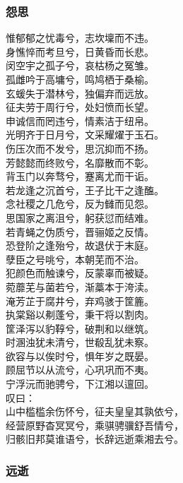 \documentclass[]{article}
\begin{document}
\hypertarget{header-n331}{%
\subsubsection{怨思}\label{header-n331}}

惟郁郁之忧毒兮，志坎壈而不违。\\
身憔悴而考旦兮，日黄昏而长悲。\\
闵空宇之孤子兮，哀枯杨之冤雏。\\
孤雌吟于高墉兮，鸣鸠栖于桑榆。\\
玄蝯失于潜林兮，独偏弃而远放。\\
征夫劳于周行兮，处妇愤而长望。\\
申诚信而罔违兮，情素洁于纽帛。\\
光明齐于日月兮，文采耀燿于玉石。\\
伤压次而不发兮，思沉抑而不扬。\\
芳懿懿而终败兮，名靡散而不彰。\\
背玉门以奔骛兮，蹇离尤而干诟。\\
若龙逢之沉首兮，王子比干之逢醢。\\
念社稷之几危兮，反为雠而见怨。\\
思国家之离沮兮，躬获愆而结难。\\
若青蝇之伪质兮，晋骊姬之反情。\\
恐登阶之逢殆兮，故退伏于末庭。\\
孽臣之号咷兮，本朝芜而不治。\\
犯颜色而触谏兮，反蒙辜而被疑。\\
菀蘼芜与菌若兮，渐藁本于洿渎。\\
淹芳芷于腐井兮，弃鸡骇于筐簏。\\
执棠谿以刜蓬兮，秉干将以割肉。\\
筐泽泻以豹鞟兮，破荆和以继筑。\\
时溷浊犹未清兮，世殽乱犹未察。\\
欲容与以俟时兮，惧年岁之既晏。\\
顾屈节以从流兮，心巩巩而不夷。\\
宁浮沅而驰骋兮，下江湘以邅回。\\
叹曰：\\
山中槛槛余伤怀兮，征夫皇皇其孰依兮，\\
经营原野杳冥冥兮，乘骐骋骥舒吾情兮，\\
归骸旧邦莫谁语兮，长辞远逝乘湘去兮。

\hypertarget{header-n336}{%
\subsubsection{远逝}\label{header-n336}}
\end{document}
